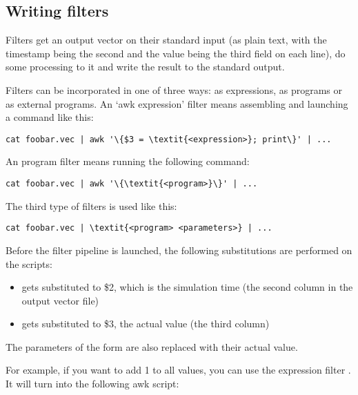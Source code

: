 \subsection{Writing filters}

Filters get an output vector on their standard input (as plain
text, with the timestamp being the second and the value being
the third field on each line), do some processing to it and write
the result to the standard output.


Filters can be incorporated in one of three ways: as 
expressions, as  programs or as external programs. An `awk
expression' filter means assembling and launching a command like this:

\begin{Verbatim}[commandchars=\\\{\}]
cat foobar.vec | awk '\{$3 = \textit{<expression>}; print\}' | ...
\end{Verbatim}

An  program filter means running the following command:

\begin{Verbatim}[commandchars=\\\{\}]
cat foobar.vec | awk '\{\textit{<program>}\}' | ...
\end{Verbatim}

The third type of filters is used like this:

\begin{Verbatim}[commandchars=\\\{\}]
cat foobar.vec | \textit{<program> <parameters>} | ...
\end{Verbatim}

Before the filter pipeline is launched, the following substitutions
are performed on the  scripts:

\begin{itemize}
  \item {} gets substituted to \$2, which is the simulation time
  (the second column in the output vector file)
  \item {} gets substituted to \$3, the actual value (the third column)
\end{itemize}

The parameters of the form  are also replaced with
their actual value.

For example, if you want to add 1 to all values, you can use the 
expression filter . It will turn into the following awk script:

